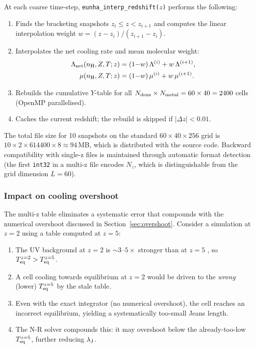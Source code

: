 \documentclass[fleqn,usenatbib]{mnras}
\newcommand{\lJ}{\lambda_{\rm J}}
\newcommand{\code}[1]{\texttt{#1}}
\begin{document}
At each coarse time-step, \code{eunha\_interp\_redshift($z$)} performs
the following:
\begin{enumerate}
  \item Finds the bracketing snapshots $z_i \le z < z_{i+1}$ and
    computes the linear interpolation weight
    $w = (z - z_i)/(z_{i+1} - z_i)$.
  \item Interpolates the net cooling rate and mean molecular weight:
    \begin{align}
      \Lambda_{\rm net}(n_{\rm H}, Z, T; z)
        &= (1{-}w)\,\Lambda^{(i)} + w\,\Lambda^{(i+1)}, \\
      \mu(n_{\rm H}, Z, T; z)
        &= (1{-}w)\,\mu^{(i)} + w\,\mu^{(i+1)}.
    \end{align}
  \item Rebuilds the cumulative $Y$-table for all
    $N_{\rm dens} \times N_{\rm metal} = 60 \times 40 = 2400$ cells
    (OpenMP parallelised).
  \item Caches the current redshift; the rebuild is skipped if
    $|\Delta z| < 0.01$.
\end{enumerate}

The total file size for 10 snapshots on the standard
$60 \times 40 \times 256$ grid is
$10 \times 2 \times 614400 \times 8 \approx 94\,$MB, which is
distributed with the source code.  Backward compatibility with
single-z files is maintained through automatic format detection
(the first \code{int32} in a multi-z file encodes $N_z$, which is
distinguishable from the grid dimension $L = 60$).

\subsubsection{Impact on cooling overshoot}
\label{sec:multi_z_overshoot}

The multi-z table eliminates a systematic error that compounds with the
numerical overshoot discussed in Section~\ref{sec:overshoot}.  Consider
a simulation at $z = 2$ using a table computed at $z = 5$:

\begin{enumerate}
  \item The UV background at $z = 2$ is $\sim 3$--$5\times$ stronger
    than at $z = 5$ \citep{HM2012}, so
    $T_{\rm eq}^{z=2} > T_{\rm eq}^{z=5}$.
  \item A cell cooling towards equilibrium at $z = 2$ would be driven
    to the \emph{wrong} (lower) $T_{\rm eq}^{z=5}$ by the stale table.
  \item Even with the exact integrator (no numerical overshoot), the
    cell reaches an incorrect equilibrium, yielding a systematically
    too-small Jeans length.
  \item The N-R solver compounds this: it may overshoot below the
    already-too-low $T_{\rm eq}^{z=5}$, further reducing $\lJ$.
\end{enumerate}
\end{document}
